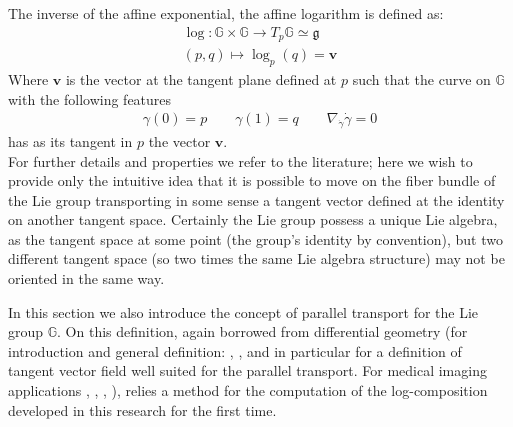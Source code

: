 \noindent
The inverse of the affine exponential, the affine logarithm is defined as:
\begin{align*}
\log :  \mathbb{G}  \times \mathbb{G}   \longrightarrow T_{p}\mathbb{G}   \simeq \mathfrak{g} 
\\ 
(p,q) \longmapsto \log_{p}(q)  = \mathbf{v} 
\end{align*}
Where $\mathbf{v} $ is the vector at the tangent plane defined at $p$ such that the curve on $\mathbb{G} $ with the following features
\begin{align*}
\gamma(0) = p\qquad  \gamma(1) = q \qquad \nabla_{\dot{\gamma}}\dot{\gamma} = 0 
\end{align*}
has as its tangent in $p$ the vector $\mathbf{v}$.\\

For further details and properties we refer to the literature; here we wish to provide only the intuitive idea that it is possible to move on the fiber bundle of the Lie group transporting in some sense a tangent vector defined at the identity on another tangent space. Certainly the Lie group possess a unique Lie algebra, as the tangent space at some point (the group's identity by convention), but two different tangent space (so two times the same Lie algebra structure) may not be oriented in the same way. 

In this section we also introduce the concept of parallel transport for the Lie group $\mathbb{G}$. On this definition, again borrowed from differential geometry (for introduction and general definition: \cite{misner1973gravitation}, \cite{knebelman1951spaces}, \cite{kheyfets2000schild} and in particular \cite{warner} for a definition of tangent vector field well suited for the parallel transport. For medical imaging applications \cite{lorenzi2011schild}, \cite{pennec2011parallel}, \cite{lorenzi2013geodesics}, \cite{lorenzi2014efficient}), relies a method for the computation of the log-composition developed in this research for the first time.

